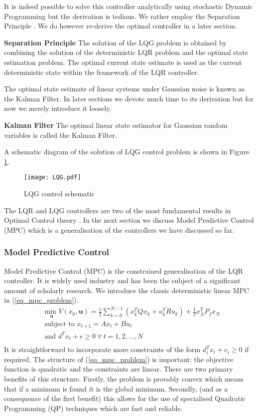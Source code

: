 It is indeed possible to solve this controller analytically using stochastic Dynamic Programming but the derivation is tedious. We rather employ the Separation Principle \cite{lqg}. We do however re-derive the optimal controller in a later section.
\begin{defn}
\textbf{Separation Principle} The solution of the LQG problem is obtained by combining the solution of the deterministic LQR problem and the optimal state estimation problem. The optimal current state estimate is used as the current deterministic state within the framework of the LQR controller. 
\end{defn}
The optimal state estimate of linear systems under Gaussian noise is known as the Kalman Filter. In later sections we devote much time to its derivation but for now we merely introduce it loosely.
\begin{defn}
\textbf{Kalman Filter} The optimal linear state estimator for Gaussian random variables is called the Kalman Filter.
\end{defn}
A schematic diagram of the solution of LQG control problem is shown  in Figure \ref{fig_lqg}.
\begin{figure}[H] 
\centering
\texttt{[image: LQG.pdf]}
\caption{LQG control schematic}
\label{fig_lqg}
\end{figure}
The LQR and LQG controllers are two of the most fundamental results in Optimal Control theory \cite{robust}. In the next section we discuss Model Predictive Control (MPC) which is a generalisation of the controllers we have discussed so far.

\subsubsection{Model Predictive Control}
Model Predictive Control (MPC) is the constrained generalisation of the LQR controller. It is widely used industry and has been the subject of a significant amount of scholarly research. We introduce the classic deterministic linear MPC in (\ref{eq_mpc_problem}).
\begin{equation}
\begin{aligned}
&\underset{\mathbf{u}}{\text{min }} V(x_0, \mathbf{u}) = \frac{1}{2}\sum_{k=0}^{N-1} \left( x_k^TQx_k + u_k^TRu_k \right) + \frac{1}{2}x_N^TP_fx_N \\
& \text{subject to } x_{t+1} = Ax_t+Bu_t \\
& \text{and } d^Tx_t + e \geq 0 ~\forall~t=1, 2,...,N \\
\end{aligned}
\label{eq_mpc_problem}
\end{equation}
It is straightforward to incorporate more constraints of the form $d_i^Tx_t + e_i \geq 0$ if required. The structure of (\ref{eq_mpc_problem}) is important: the objective function is quadratic and the constraints are linear. There are two primary benefits of this structure. Firstly, the problem is provably convex which means that if a minimum is found it is the global minimum. Secondly, (and as a consequence of the first benefit) this allows for the use of specialised Quadratic Programming (QP) techniques which are fast and reliable. 

